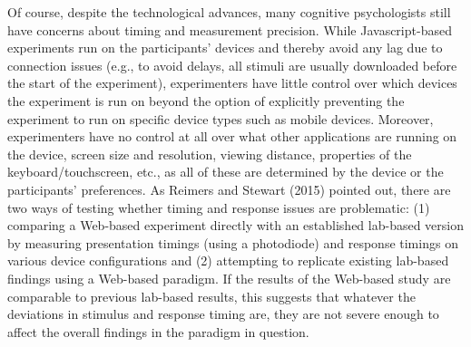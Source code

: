 \documentclass[
  english,
  man,floatsintext]{apa6}
\begin{document}
Of course, despite the technological advances, many cognitive psychologists still have concerns about timing and measurement precision. While Javascript-based experiments run on the participants' devices and thereby avoid any lag due to connection issues (e.g., to avoid delays, all stimuli are usually downloaded before the start of the experiment), experimenters have little control over which devices the experiment is run on beyond the option of explicitly preventing the experiment to run on specific device types such as mobile devices. Moreover, experimenters have no control at all over what other applications are running on the device, screen size and resolution, viewing distance, properties of the keyboard/touchscreen, etc., as all of these are determined by the device or the participants' preferences. As Reimers and Stewart (2015) pointed out, there are two ways of testing whether timing and response issues are problematic: (1) comparing a Web-based experiment directly with an established lab-based version by measuring presentation timings (using a photodiode) and response timings on various device configurations and (2) attempting to replicate existing lab-based findings using a Web-based paradigm. If the results of the Web-based study are comparable to previous lab-based results, this suggests that whatever the deviations in stimulus and response timing are, they are not severe enough to affect the overall findings in the paradigm in question.
\end{document}
